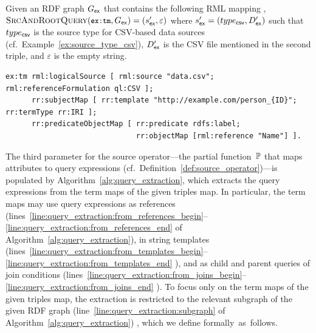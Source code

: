 \begin{example}
	\label{ex:initSrcAndRootQuery}
		Given
	an RDF graph $G_\mathsf{ex}$ that
		contains
	the
		following RML mapping%
	, $\textsc{SrcAndRootQuery}(\texttt{\small ex:tm},G_\mathsf{ex}) = (s_\mathsf{ex}', \varepsilon)$ where $s_\mathsf{ex}' = (type_{\mathsf{csv}},D_\mathsf{ex}')$ such that $type_{\mathsf{csv}}$ is the source type for CSV-based data sources (cf.\ Example~\ref{ex:source_type_csv}), $D_\mathsf{ex}'$ is the CSV file mentioned in the second triple, and $\varepsilon$ is the empty string.
	{\scriptsize%
	\begin{verbatim}
ex:tm rml:logicalSource [ rml:source "data.csv";  rml:referenceFormulation ql:CSV ];
      rr:subjectMap [ rr:template "http://example.com/person_{ID}";  rr:termType rr:IRI ];
      rr:predicateObjectMap [ rr:predicate rdfs:label;
                              rr:objectMap [rml:reference "Name"] ].
	\end{verbatim}%
	}
\end{example}

The third parameter for the source operator---the
	partial
function~$\mathbb{P}$
	that maps attributes to query expressions
(cf.\ Definition~\ref{def:source_operator})---is populated by
	Algorithm~\ref{alg:query_extraction}, which
extracts the query expressions
	from the term maps of
the given triples map. In particular, the term maps may use query expressions as references (lines~\ref{line:query_extraction:from_references_begin}--\ref{line:query_extraction:from_references_end} of Algorithm~\ref{alg:query_extraction}), in
	string
templates (lines~\ref{line:query_extraction:from_templates_begin}--\ref{line:query_extraction:from_templates_end}%
), and
	as child and parent queries of
join conditions (lines~\ref{line:query_extraction:from_joins_begin}--\ref{line:query_extraction:from_joins_end}%
).
	To focus only on the term maps of the given triples map, the extraction is restricted to the relevant
subgraph of the given RDF graph (line~\ref{line:query_extraction:subgraph} of Algorithm~\ref{alg:query_extraction})%
	, which we define formally~as~follows.

